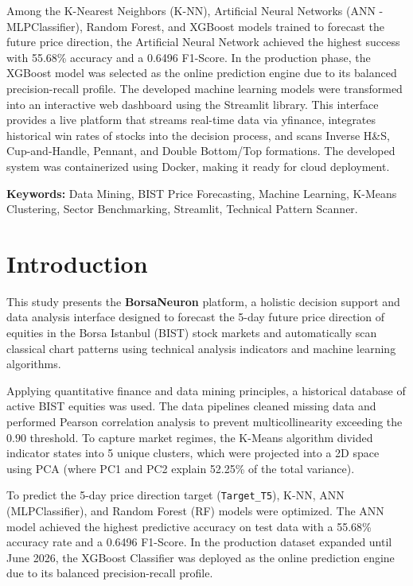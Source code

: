 \documentclass[12pt,a4paper]{report}
\begin{document}
Among the K-Nearest Neighbors (K-NN), Artificial Neural Networks (ANN - MLPClassifier), Random Forest, and XGBoost models trained to forecast the future price direction, the Artificial Neural Network achieved the highest success with 55.68\% accuracy and a 0.6496 F1-Score. In the production phase, the XGBoost model was selected as the online prediction engine due to its balanced precision-recall profile. The developed machine learning models were transformed into an interactive web dashboard using the Streamlit library. This interface provides a live platform that streams real-time data via yfinance, integrates historical win rates of stocks into the decision process, and scans Inverse H&S, Cup-and-Handle, Pennant, and Double Bottom/Top formations. The developed system was containerized using Docker, making it ready for cloud deployment.

\vspace*{1cm}
\noindent \textbf{Keywords:} Data Mining, BIST Price Forecasting, Machine Learning, K-Means Clustering, Sector Benchmarking, Streamlit, Technical Pattern Scanner.

\newpage

\tableofcontents

\newpage
{}

\chapter{Introduction}

This study presents the \textbf{BorsaNeuron} platform, a holistic decision support and data analysis interface designed to forecast the 5-day future price direction of equities in the Borsa Istanbul (BIST) stock markets and automatically scan classical chart patterns using technical analysis indicators and machine learning algorithms.

Applying quantitative finance and data mining principles, a historical database of active BIST equities was used. The data pipelines cleaned missing data and performed Pearson correlation analysis to prevent multicollinearity exceeding the $0.90$ threshold. To capture market regimes, the K-Means algorithm divided indicator states into 5 unique clusters, which were projected into a 2D space using PCA (where PC1 and PC2 explain 52.25\% of the total variance).

To predict the 5-day price direction target (\texttt{Target\_T5}), K-NN, ANN (MLPClassifier), and Random Forest (RF) models were optimized. The ANN model achieved the highest predictive accuracy on test data with a 55.68\% accuracy rate and a 0.6496 F1-Score. In the production dataset expanded until June 2026, the XGBoost Classifier was deployed as the online prediction engine due to its balanced precision-recall profile.
\end{document}
